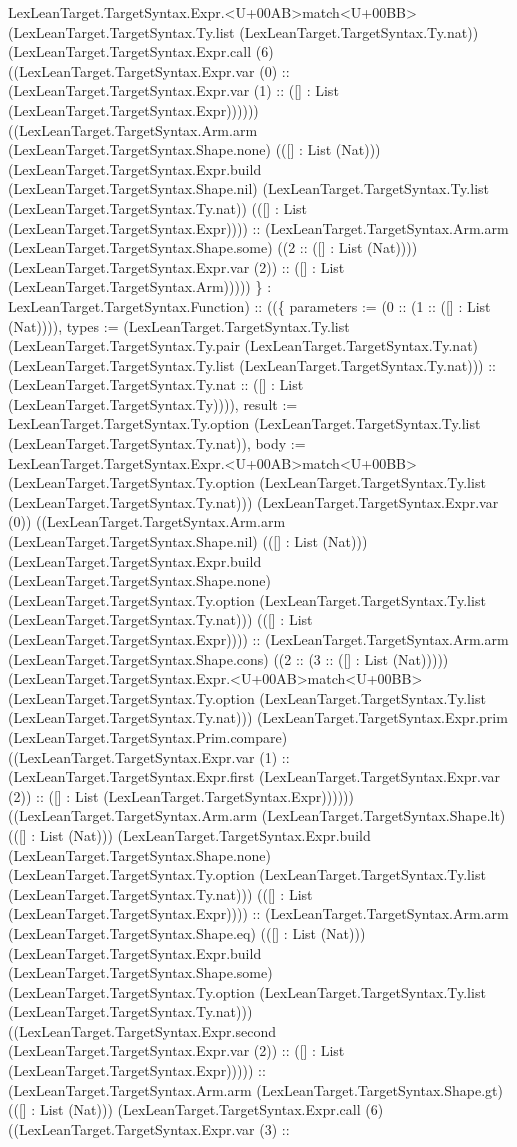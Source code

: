 \documentclass[11pt]{article}
\begin{document}
LexLeanTarget.TargetSyntax.Expr.<U+00AB>match<U+00BB> (LexLeanTarget.TargetSyntax.Ty.list (LexLeanTarget.TargetSyntax.Ty.nat)) (LexLeanTarget.TargetSyntax.Expr.call (6) ((LexLeanTarget.TargetSyntax.Expr.var (0) :: (LexLeanTarget.TargetSyntax.Expr.var (1) :: ([] : List (LexLeanTarget.TargetSyntax.Expr)))))) ((LexLeanTarget.TargetSyntax.Arm.arm (LexLeanTarget.TargetSyntax.Shape.none) (([] : List (Nat))) (LexLeanTarget.TargetSyntax.Expr.build (LexLeanTarget.TargetSyntax.Shape.nil) (LexLeanTarget.TargetSyntax.Ty.list (LexLeanTarget.TargetSyntax.Ty.nat)) (([] : List (LexLeanTarget.TargetSyntax.Expr)))) :: (LexLeanTarget.TargetSyntax.Arm.arm (LexLeanTarget.TargetSyntax.Shape.some) ((2 :: ([] : List (Nat)))) (LexLeanTarget.TargetSyntax.Expr.var (2)) :: ([] : List (LexLeanTarget.TargetSyntax.Arm))))) \} : LexLeanTarget.TargetSyntax.Function) :: ((\{ parameters := (0 :: (1 :: ([] : List (Nat)))), types := (LexLeanTarget.TargetSyntax.Ty.list (LexLeanTarget.TargetSyntax.Ty.pair (LexLeanTarget.TargetSyntax.Ty.nat) (LexLeanTarget.TargetSyntax.Ty.list (LexLeanTarget.TargetSyntax.Ty.nat))) :: (LexLeanTarget.TargetSyntax.Ty.nat :: ([] : List (LexLeanTarget.TargetSyntax.Ty)))), result := LexLeanTarget.TargetSyntax.Ty.option (LexLeanTarget.TargetSyntax.Ty.list (LexLeanTarget.TargetSyntax.Ty.nat)), body := LexLeanTarget.TargetSyntax.Expr.<U+00AB>match<U+00BB> (LexLeanTarget.TargetSyntax.Ty.option (LexLeanTarget.TargetSyntax.Ty.list (LexLeanTarget.TargetSyntax.Ty.nat))) (LexLeanTarget.TargetSyntax.Expr.var (0)) ((LexLeanTarget.TargetSyntax.Arm.arm (LexLeanTarget.TargetSyntax.Shape.nil) (([] : List (Nat))) (LexLeanTarget.TargetSyntax.Expr.build (LexLeanTarget.TargetSyntax.Shape.none) (LexLeanTarget.TargetSyntax.Ty.option (LexLeanTarget.TargetSyntax.Ty.list (LexLeanTarget.TargetSyntax.Ty.nat))) (([] : List (LexLeanTarget.TargetSyntax.Expr)))) :: (LexLeanTarget.TargetSyntax.Arm.arm (LexLeanTarget.TargetSyntax.Shape.cons) ((2 :: (3 :: ([] : List (Nat))))) (LexLeanTarget.TargetSyntax.Expr.<U+00AB>match<U+00BB> (LexLeanTarget.TargetSyntax.Ty.option (LexLeanTarget.TargetSyntax.Ty.list (LexLeanTarget.TargetSyntax.Ty.nat))) (LexLeanTarget.TargetSyntax.Expr.prim (LexLeanTarget.TargetSyntax.Prim.compare) ((LexLeanTarget.TargetSyntax.Expr.var (1) :: (LexLeanTarget.TargetSyntax.Expr.first (LexLeanTarget.TargetSyntax.Expr.var (2)) :: ([] : List (LexLeanTarget.TargetSyntax.Expr)))))) ((LexLeanTarget.TargetSyntax.Arm.arm (LexLeanTarget.TargetSyntax.Shape.lt) (([] : List (Nat))) (LexLeanTarget.TargetSyntax.Expr.build (LexLeanTarget.TargetSyntax.Shape.none) (LexLeanTarget.TargetSyntax.Ty.option (LexLeanTarget.TargetSyntax.Ty.list (LexLeanTarget.TargetSyntax.Ty.nat))) (([] : List (LexLeanTarget.TargetSyntax.Expr)))) :: (LexLeanTarget.TargetSyntax.Arm.arm (LexLeanTarget.TargetSyntax.Shape.eq) (([] : List (Nat))) (LexLeanTarget.TargetSyntax.Expr.build (LexLeanTarget.TargetSyntax.Shape.some) (LexLeanTarget.TargetSyntax.Ty.option (LexLeanTarget.TargetSyntax.Ty.list (LexLeanTarget.TargetSyntax.Ty.nat))) ((LexLeanTarget.TargetSyntax.Expr.second (LexLeanTarget.TargetSyntax.Expr.var (2)) :: ([] : List (LexLeanTarget.TargetSyntax.Expr))))) :: (LexLeanTarget.TargetSyntax.Arm.arm (LexLeanTarget.TargetSyntax.Shape.gt) (([] : List (Nat))) (LexLeanTarget.TargetSyntax.Expr.call (6) ((LexLeanTarget.TargetSyntax.Expr.var (3) :: 
\end{document}
